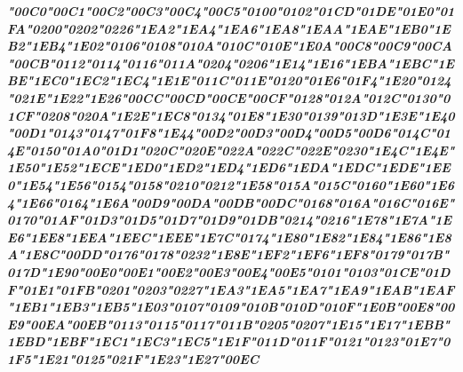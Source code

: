 {\LibertinusSerifPatch\itshape\bfseries 
	\char"00C0\gs \char"00C1\gs \char"00C2\gs \char"00C3\gs \char"00C4\gs \char"00C5\gs \char"0100\gs \char"0102\gs \char"01CD\gs \char"01DE\gs \char"01E0\gs \char"01FA\gs \char"0200\gs \char"0202\gs \char"0226\gs \char"1EA2\gs \char"1EA4\gs \char"1EA6\gs \char"1EA8\gs \char"1EAA\gs \char"1EAE\gs \char"1EB0\gs \char"1EB2\gs \char"1EB4\gs \char"1E02\gs \char"0106\gs \char"0108\gs \char"010A\gs \char"010C\gs \char"010E\gs \char"1E0A\gs \char"00C8\gs \char"00C9\gs \char"00CA\gs \char"00CB\gs \char"0112\gs \char"0114\gs \char"0116\gs \char"011A\gs \char"0204\gs \char"0206\gs \char"1E14\gs \char"1E16\gs \char"1EBA\gs \char"1EBC\gs \char"1EBE\gs \char"1EC0\gs \char"1EC2\gs \char"1EC4\gs \char"1E1E\gs \char"011C\gs \char"011E\gs \char"0120\gs \char"01E6\gs \char"01F4\gs \char"1E20\gs \char"0124\gs \char"021E\gs \char"1E22\gs \char"1E26\gs \char"00CC\gs \char"00CD\gs \char"00CE\gs \char"00CF\gs \char"0128\gs \char"012A\gs \char"012C\gs \char"0130\gs \char"01CF\gs \char"0208\gs \char"020A\gs \char"1E2E\gs \char"1EC8\gs \char"0134\gs \char"01E8\gs \char"1E30\gs \char"0139\gs \char"013D\gs \char"1E3E\gs \char"1E40\gs \char"00D1\gs \char"0143\gs \char"0147\gs \char"01F8\gs \char"1E44\gs \char"00D2\gs \char"00D3\gs \char"00D4\gs \char"00D5\gs \char"00D6\gs \char"014C\gs \char"014E\gs \char"0150\gs \char"01A0\gs \char"01D1\gs \char"020C\gs \char"020E\gs \char"022A\gs \char"022C\gs \char"022E\gs \char"0230\gs \char"1E4C\gs \char"1E4E\gs \char"1E50\gs \char"1E52\gs \char"1ECE\gs \char"1ED0\gs \char"1ED2\gs \char"1ED4\gs \char"1ED6\gs \char"1EDA\gs \char"1EDC\gs \char"1EDE\gs \char"1EE0\gs \char"1E54\gs \char"1E56\gs \char"0154\gs \char"0158\gs \char"0210\gs \char"0212\gs \char"1E58\gs \char"015A\gs \char"015C\gs \char"0160\gs \char"1E60\gs \char"1E64\gs \char"1E66\gs \char"0164\gs \char"1E6A\gs \char"00D9\gs \char"00DA\gs \char"00DB\gs \char"00DC\gs \char"0168\gs \char"016A\gs \char"016C\gs \char"016E\gs \char"0170\gs \char"01AF\gs \char"01D3\gs \char"01D5\gs \char"01D7\gs \char"01D9\gs \char"01DB\gs \char"0214\gs \char"0216\gs \char"1E78\gs \char"1E7A\gs \char"1EE6\gs \char"1EE8\gs \char"1EEA\gs \char"1EEC\gs \char"1EEE\gs \char"1E7C\gs \char"0174\gs \char"1E80\gs \char"1E82\gs \char"1E84\gs \char"1E86\gs \char"1E8A\gs \char"1E8C\gs \char"00DD\gs \char"0176\gs \char"0178\gs \char"0232\gs \char"1E8E\gs \char"1EF2\gs \char"1EF6\gs \char"1EF8\gs \char"0179\gs \char"017B\gs \char"017D\gs \char"1E90\gs \char"00E0\gs \char"00E1\gs \char"00E2\gs \char"00E3\gs \char"00E4\gs \char"00E5\gs \char"0101\gs \char"0103\gs \char"01CE\gs \char"01DF\gs \char"01E1\gs \char"01FB\gs \char"0201\gs \char"0203\gs \char"0227\gs \char"1EA3\gs \char"1EA5\gs \char"1EA7\gs \char"1EA9\gs \char"1EAB\gs \char"1EAF\gs \char"1EB1\gs \char"1EB3\gs \char"1EB5\gs \char"1E03\gs \char"0107\gs \char"0109\gs \char"010B\gs \char"010D\gs \char"010F\gs \char"1E0B\gs \char"00E8\gs \char"00E9\gs \char"00EA\gs \char"00EB\gs \char"0113\gs \char"0115\gs \char"0117\gs \char"011B\gs \char"0205\gs \char"0207\gs \char"1E15\gs \char"1E17\gs \char"1EBB\gs \char"1EBD\gs \char"1EBF\gs \char"1EC1\gs \char"1EC3\gs \char"1EC5\gs \char"1E1F\gs \char"011D\gs \char"011F\gs \char"0121\gs \char"0123\gs \char"01E7\gs \char"01F5\gs \char"1E21\gs \char"0125\gs \char"021F\gs \char"1E23\gs \char"1E27\gs \char"00EC\gs }
